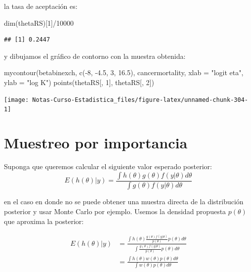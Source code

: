 \documentclass[
  12pt,
]{book}
\newenvironment{Shaded}{\begin{snugshade}}{\end{snugshade}}
\newcommand{\AttributeTok}[1]{\textcolor[rgb]{0.77,0.63,0.00}{#1}}
\newcommand{\DecValTok}[1]{\textcolor[rgb]{0.00,0.00,0.81}{#1}}
\newcommand{\FloatTok}[1]{\textcolor[rgb]{0.00,0.00,0.81}{#1}}
\newcommand{\FunctionTok}[1]{\textcolor[rgb]{0.00,0.00,0.00}{#1}}
\newcommand{\NormalTok}[1]{#1}
\newcommand{\SpecialCharTok}[1]{\textcolor[rgb]{0.00,0.00,0.00}{#1}}
\newcommand{\StringTok}[1]{\textcolor[rgb]{0.31,0.60,0.02}{#1}}
\begin{document}
la tasa de aceptación es:

\begin{Shaded}
\begin{Highlighting}[]
\FunctionTok{dim}\NormalTok{(thetaRS)[}\DecValTok{1}\NormalTok{]}\SpecialCharTok{/}\DecValTok{10000}
\end{Highlighting}
\end{Shaded}

\begin{verbatim}
## [1] 0.2447
\end{verbatim}

y dibujamos el gráfico de contorno con la muestra obtenida:

\begin{Shaded}
\begin{Highlighting}[]
\FunctionTok{mycontour}\NormalTok{(betabinexch, }\FunctionTok{c}\NormalTok{(}\SpecialCharTok{{-}}\DecValTok{8}\NormalTok{, }\SpecialCharTok{{-}}\FloatTok{4.5}\NormalTok{, }\DecValTok{3}\NormalTok{, }\FloatTok{16.5}\NormalTok{), cancermortality,}
    \AttributeTok{xlab =} \StringTok{"logit eta"}\NormalTok{, }\AttributeTok{ylab =} \StringTok{"log K"}\NormalTok{)}
\FunctionTok{points}\NormalTok{(thetaRS[, }\DecValTok{1}\NormalTok{], thetaRS[, }\DecValTok{2}\NormalTok{])}
\end{Highlighting}
\end{Shaded}

\begin{center}\texttt{[image: Notas-Curso-Estadistica\_files/figure-latex/unnamed-chunk-304-1]} \end{center}

\hypertarget{muestreo-por-importancia}{%
\section{Muestreo por importancia}\label{muestreo-por-importancia}}

Suponga que queremos calcular el siguiente valor esperado posterior:
\[E(h(\theta)|y)=\frac{\int h(\theta)g(\theta)f(y|\theta)d\theta}{\int g(\theta)f(y|\theta)d\theta}\]

en el caso en donde no se puede obtener una muestra directa de la
distribución posterior y usar Monte Carlo por ejemplo. Usemos la
densidad propuesta \(p(\theta)\) que aproxima la posterior:

\begin{align*}
E(h(\theta)|y)&=\frac{\int h(\theta)\frac{g(\theta)f(y|\theta)}{p(\theta)}p(\theta)d\theta}{\int \frac{g(\theta)f(y|\theta)}{p(\theta)}p(\theta)d\theta}\\
&=\frac{\int h(\theta)w(\theta)p(\theta)d\theta}{\int w(\theta)p(\theta)d\theta}
\end{align*}
\end{document}
